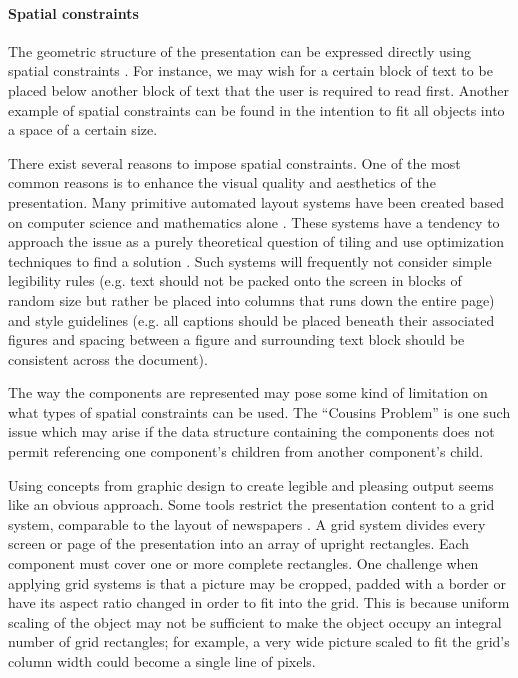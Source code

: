      \paragraph{Spatial constraints}
      \label{spatialcon}

      The geometric structure of the presentation can be expressed directly
      using spatial constraints . For instance, we may wish for a certain block
      of text to be placed below another block of text that the user is
      required to read first. Another example of spatial constraints can be
      found in the intention to fit all objects into a space of a certain size.

      There exist several reasons to impose spatial constraints. One of the
      most common reasons is to enhance the visual quality and aesthetics of
      the presentation. Many primitive automated layout systems have been
      created based on computer science and mathematics alone \citep{beach-1}.
      These systems have a tendency to approach the issue as a purely
      theoretical question of tiling and use optimization techniques to find a
      solution \citep{luders-1}. Such systems will frequently not consider
      simple legibility rules (e.g. text should not be packed onto the screen
      in blocks of random size but rather be placed into columns that runs down
      the entire page) and style guidelines (e.g. all captions should be
      placed beneath their associated figures and spacing between a figure and
      surrounding text block should be consistent across the document).
     
      The way the components are represented may pose some kind of limitation
      on what types of spatial constraints can be used. The ``Cousins
      Problem'' is one such issue which may arise if the data structure
      containing the components does not permit referencing one component’s
      children from another component’s child.

      Using concepts from graphic design to create legible and pleasing output
      seems like an obvious approach. Some tools restrict the presentation
      content to a grid system, comparable to the layout of newspapers
      \citep{muller-1,hurlburt-1}. A grid system divides every screen or page
      of the presentation into an array of upright rectangles. Each component
      must cover one or more complete rectangles. One challenge when applying
      grid systems is that a picture may be cropped, padded with a border or
      have its aspect ratio changed in order to fit into the grid. This is
      because uniform scaling of the object may not be sufficient to make the
      object occupy an integral number of grid rectangles; for example, a very
      wide picture scaled to fit the grid's column width could become a single
      line of pixels.

